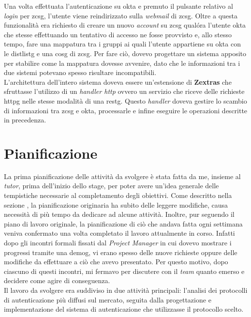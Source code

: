 Una volta effettuata l'autenticazione su \gls{okta} e premuto il pulsante relativo al \textit{login} per \gls{zcsg}, l'utente viene reindirizzato sulla \textit{webmail} di \gls{zcsg}.
Oltre a questa funzionalità era richiesto di creare un nuovo \textit{account} su \gls{zcsg} qualóra l'utente \gls{okta} che stesse effettuando un tentativo di accesso ne fosse provvisto e, allo stesso tempo, fare una mappatura tra i gruppi ai quali l'utente appartiene su \gls{okta} con le \gls{distlistg} e una \gls{cosg} di \gls{zcsg}. Per fare ciò, dovevo progettare un sistema apposito per stabilire come la mappatura dovesse avvenire, dato che le informazioni tra i due sistemi potevano spesso risultare incompatibili. \\
L'architettura dell'intero sistema doveva essere un'estensione di \textbf{Zextras} che sfruttasse l'utilizzo di un \textit{handler http} ovvero un servizio che riceve delle richieste \gls{httpg} nelle stesse modalità di una \gls{restg}. Questo \textit{handler} doveva gestire lo scambio di informazioni tra \gls{zcsg} e \gls{okta}, processarle e infine eseguire le operazioni descritte in precedenza.

\section{Pianificazione}
La prima pianificazione delle attività da svolgere è stata fatta da me, insieme al \textit{tutor}, prima dell'inizio dello stage, per poter avere un'idea generale delle tempistiche necessarie al completamento degli obiettivi. Come descritto nella sezione , la pianificazione originaria ha subito delle leggere modifiche, causa necessità di più tempo da dedicare ad alcune attività. Inoltre, pur seguendo il piano di lavoro originale, la pianificazione di ciò che andava fatta ogni settimana veniva confermato una volta completato il lavoro attualmente in corso.
Infatti dopo gli incontri formali fissati dal \textit{Project Manager} in cui dovevo mostrare i progressi tramite una \gls{demog}, vi erano spesso delle nuove richieste oppure delle modifiche da effettuare a ciò che avevo presentato. Per questo motivo, dopo ciascuno di questi incontri, mi fermavo per discutere con il \textit{team} quanto emerso e decidere come agire di conseguenza. \\
Il lavoro da svolgere era suddiviso in due attività principali: l'analisi dei protocolli di autenticazione più diffusi sul mercato, seguita dalla progettazione e implementazione del sistema di autenticazione che utilizzasse il protocollo scelto.
